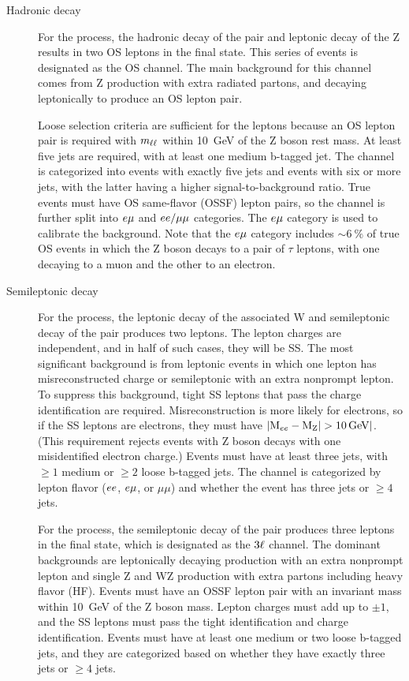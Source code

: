 \begin{description}
  \item[Hadronic \ttbar decay] For the \ttZ process, the hadronic decay of the
    \ttbar pair and leptonic decay of the Z results in two OS leptons in the
    final state. This series of events is designated as the OS \ttZ channel. The
    main background for this channel comes from Z production with extra radiated
    partons, and \ttbar decaying leptonically to produce an OS lepton pair.

    Loose selection criteria are sufficient for the leptons because an OS lepton
    pair is required with $m_{{\ell}{\ell}}$ within \SI{10}{GeV} of the Z boson rest
    mass. At least five jets are required, with at least one medium b-tagged
    jet.  The channel is categorized into events with exactly five jets and
    events with six or more jets, with the latter having a higher
    signal-to-background ratio. True \ttZ events must have OS same-flavor (OSSF)
    lepton pairs, so the channel is further split into $e\mu$ and
    $ee/\mu\mu$ categories. The $e\mu$ category is used to calibrate the
    \ttbar background. Note that the $e\mu$ category includes $\sim
    \SI{6}{\percent}$ of true OS \ttZ events in which the Z boson decays to a
    pair of $\tau$ leptons, with one decaying to a muon and the other to an
    electron.

  \item[Semileptonic \ttbar decay] For the \ttW process, the leptonic decay of
    the associated W and semileptonic decay of the \ttbar pair produces two
    leptons. The lepton charges are independent, and in half of such cases, they
    will be SS. The most significant background is from leptonic \ttbar events
    in which one lepton has misreconstructed charge or semileptonic \ttbar with
    an extra nonprompt lepton. To suppress this background, tight SS leptons
    that pass the charge identification are required. Misreconstruction is more
    likely for electrons, so if the SS leptons are electrons, they must have
    $|\text{M}_{ee} - \text{M}_\text{Z}| > \SI{10}{GeV}|$. (This requirement
    rejects events with Z boson decays with one misidentified electron charge.)
    Events must have at least three jets, with $\ge1$ medium or $\ge2$ loose
    b-tagged jets. The channel is categorized by lepton flavor ($ee$,
    $e\mu$, or $\mu\mu$) and whether the event has three jets or $\ge4$ jets.

    For the \ttZ process, the semileptonic decay of the \ttbar pair produces
    three leptons in the final state, which is designated as the $3{\ell}$ \ttZ
    channel. The dominant backgrounds are leptonically decaying \ttbar
    production with an extra nonprompt lepton and single Z and WZ production
    with extra partons including heavy flavor (HF). Events must have an OSSF
    lepton pair with an invariant mass within \SI{10}{GeV} of the Z boson mass.
    Lepton charges must add up to $\pm1$, and the SS leptons must pass the tight
    identification and charge identification. Events must have at least one
    medium or two loose b-tagged jets, and they are categorized based on whether
    they have exactly three jets or $\ge4$ jets.


\end{description}
